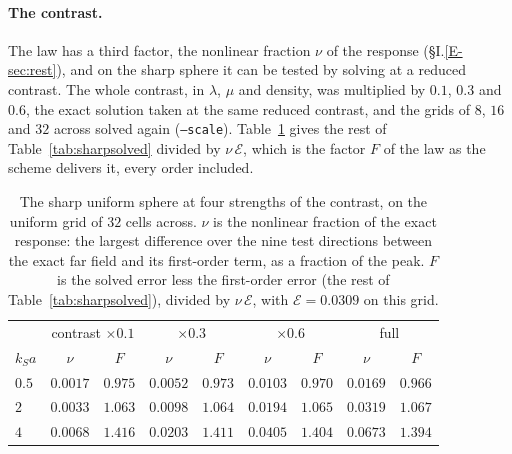 \documentclass[11pt,a4paper]{article}
\newcommand{\cE}{\mathcal{E}}
\begin{document}
\paragraph{The contrast.} The law has a third factor, the nonlinear fraction $\nu$ of the response
(\S I.\ref{E-sec:rest}), and on the sharp sphere it can be tested by solving at a reduced contrast. The whole
contrast, in $\lambda$, $\mu$ and density, was multiplied by $0.1$, $0.3$ and $0.6$, the exact solution
taken at the same reduced contrast, and the grids of $8$, $16$ and $32$ across solved again
(\texttt{--scale}). Table~\ref{tab:sharpcontrast} gives the rest of Table~\ref{tab:sharpsolved} divided
by $\nu\,\cE$, which is the factor $F$ of the law as the scheme delivers it, every order included.
\begin{table}[htbp]
\centering
\caption{The sharp uniform sphere at four strengths of the contrast, on the uniform grid of $32$ cells
across. $\nu$ is the nonlinear fraction of the exact response: the largest difference over the nine test
directions between the exact far field and its first-order term, as a fraction of the peak. $F$ is the
solved error less the first-order error (the rest of Table~\ref{tab:sharpsolved}), divided by
$\nu\,\cE$, with $\cE=0.0309$ on this grid.}\label{tab:sharpcontrast}
\small
\begin{tabular}{@{}lcccccccc@{}}
\toprule
 & \multicolumn{2}{c}{contrast $\times0.1$} & \multicolumn{2}{c}{$\times0.3$} & \multicolumn{2}{c}{$\times0.6$} & \multicolumn{2}{c}{full} \\
$k_Sa$ & $\nu$ & $F$ & $\nu$ & $F$ & $\nu$ & $F$ & $\nu$ & $F$ \\
\midrule
$0.5$ & $0.0017$ & $0.975$ & $0.0052$ & $0.973$ & $0.0103$ & $0.970$ & $0.0169$ & $0.966$ \\
$2$   & $0.0033$ & $1.063$ & $0.0098$ & $1.064$ & $0.0194$ & $1.065$ & $0.0319$ & $1.067$ \\
$4$   & $0.0068$ & $1.416$ & $0.0203$ & $1.411$ & $0.0405$ & $1.404$ & $0.0673$ & $1.394$ \\
\bottomrule
\end{tabular}
\end{table}
\end{document}

